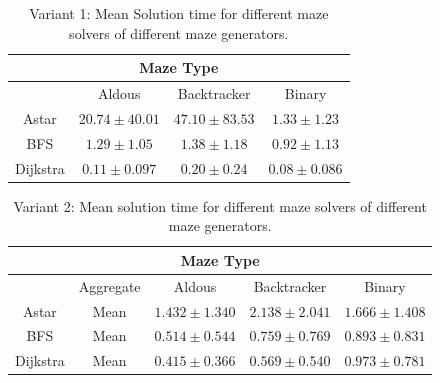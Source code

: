 \begin{table}[!h]
    \begin{center} 
        \caption{Variant 1: Mean Solution time for different maze solvers of different maze generators.} 
    \begin{tabular}{ c c c c} 
    \multicolumn{4}{c}{Maze Type} \\
    \hline
    &Aldous&Backtracker&Binary\\
    \hline
    Astar&$20.74\pm 40.01$&$47.10\pm 83.53 $&$1.33\pm 1.23$\\
    \hline
    BFS&$1.29\pm 1.05$&$1.38\pm 1.18$&$0.92\pm 1.13$\\
    \hline
    Dijkstra&$0.11\pm 0.097$&$0.20\pm 0.24$&$0.08\pm 0.086$\\  
    \hline
     \end{tabular} 
    \end{center}
     \end{table}
     \begin{table}[!h]
        \begin{center} 
            \caption{Variant 2: Mean solution time for different maze solvers of different maze generators.} 
        \begin{tabular}{ c c c c c} 
        \multicolumn{5}{c}{Maze Type} \\
        \hline
        &Aggregate&Aldous&Backtracker&Binary\\
        \hline
        Astar&Mean&$1.432\pm 1.340$&$2.138\pm 2.041$&$1.666\pm 1.408$\\
        \hline
        BFS&Mean&$0.514\pm 0.544$&$0.759\pm 0.769$&$0.893\pm 0.831$\\
        \hline
        Dijkstra&Mean&$0.415\pm 0.366$&$0.569\pm 0.540$&$0.973\pm 0.781$\\  
        \hline
         \end{tabular} 
        \end{center}
         \end{table}
\newpage
